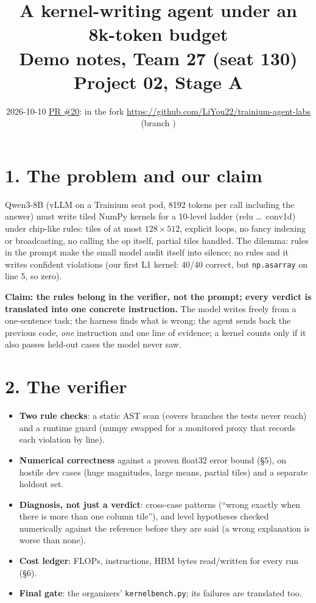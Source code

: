 \documentclass[11pt]{article}
\title{\vspace{-1.2cm}A kernel-writing agent under an 8k-token budget\\[2pt]\large Demo notes, Team 27 (seat 130) \textbullet{} Project 02, Stage A}
\date{2026-10-10 \textbullet{} \href{https://github.com/yahavb/trainium-agent-labs/pull/20}{PR \#20}: \code{projects/team-27-kernel-agent/} in the fork \url{https://github.com/LiYou22/trainium-agent-labs} (branch \code{team-27-kernel-agent})}
\author{}
\newcommand{\code}[1]{\texttt{#1}}
\begin{document}
\maketitle
\vspace{-1cm}

\section*{1. The problem and our claim}
Qwen3-8B (vLLM on a Trainium seat pod, 8192 tokens per call including the answer) must write tiled
NumPy kernels for a 10-level ladder (relu \dots\ conv1d) under chip-like rules: tiles of at most
$128\times512$, explicit loops, no fancy indexing or broadcasting, no calling the op itself, partial
tiles handled. The dilemma: rules in the prompt make the small model audit itself into silence; no
rules and it writes confident violations (our first L1 kernel: 40/40 correct, but \code{np.asarray}
on line 5, so zero).

\textbf{Claim: the rules belong in the verifier, not the prompt; every verdict is translated into one
concrete instruction.} The model writes freely from a one-sentence task; the harness finds what is
wrong; the agent sends back the previous code, \emph{one} instruction and one line of evidence; a
kernel counts only if it also passes held-out cases the model never saw.

\section*{2. The verifier}
\begin{itemize}
\item \textbf{Two rule checks}: a static AST scan (covers branches the tests never reach) and a runtime
  guard (numpy swapped for a monitored proxy that records each violation by line).
\item \textbf{Numerical correctness} against a proven float32 error bound (\S5), on hostile dev cases
  (huge magnitudes, large means, partial tiles) and a separate holdout set.
\item \textbf{Diagnosis, not just a verdict}: cross-case patterns (``wrong exactly when there is more
  than one column tile''), and level hypotheses checked numerically against the reference before they
  are said (a wrong explanation is worse than none).
\item \textbf{Cost ledger}: FLOPs, instructions, HBM bytes read/written for every run (\S6).
\item \textbf{Final gate}: the organizers' \code{kernelbench.py}; its failures are translated too.
\end{itemize}
\end{document}
